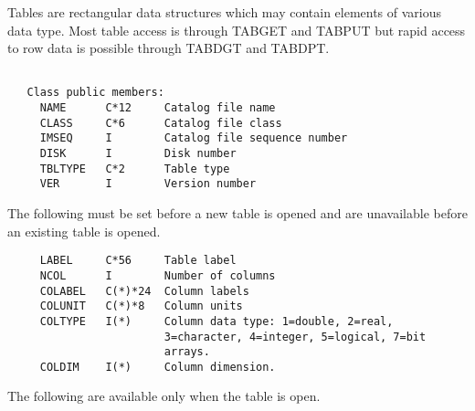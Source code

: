   Tables are rectangular data structures which may contain elements of
various data type.  Most table access is through TABGET and TABPUT
but rapid access to row data is possible through TABDGT and TABDPT.

{\small\begin{verbatim}

   Class public members:
     NAME      C*12     Catalog file name
     CLASS     C*6      Catalog file class
     IMSEQ     I        Catalog file sequence number
     DISK      I        Disk number
     TBLTYPE   C*2      Table type
     VER       I        Version number
\end{verbatim}}
   The following must be set before a new table is opened and are
   unavailable before an existing table is opened.
{\small\begin{verbatim}
     LABEL     C*56     Table label
     NCOL      I        Number of columns
     COLABEL   C(*)*24  Column labels
     COLUNIT   C(*)*8   Column units
     COLTYPE   I(*)     Column data type: 1=double, 2=real,
                        3=character, 4=integer, 5=logical, 7=bit
                        arrays.
     COLDIM    I(*)     Column dimension.
\end{verbatim}}
   The following are available only when the table is open.
